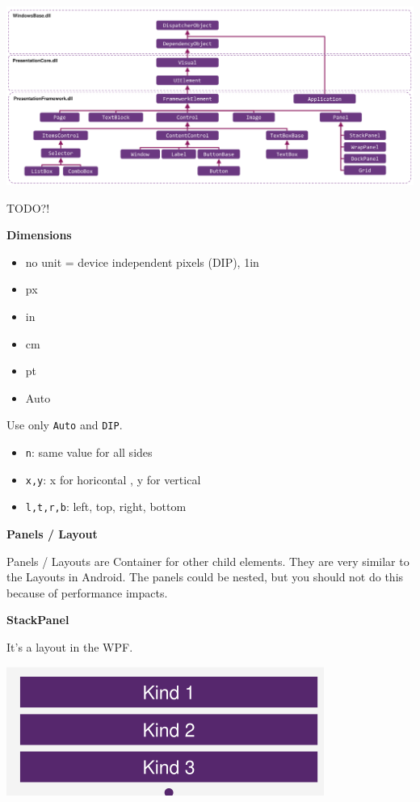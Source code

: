 \documentclass[10pt,twoside,landscape]{article}
\begin{document}
\begin{multicols}{4}
\begin{center}
\includegraphics[width=.9\linewidth]{img/class_hierarchy.png}
\end{center}

TODO?!

\textbf{Dimensions}

\begin{itemize}
\item no unit = device independent pixels (DIP), 1in
\item px
\item in
\item cm
\item pt
\item Auto
\end{itemize}

Use only \texttt{Auto} and \texttt{DIP}.
\begin{itemize}
\item \texttt{n}: same value for all sides
\item \texttt{x,y}: x for horicontal , y for vertical
\item \texttt{l,t,r,b}: left, top, right, bottom
\end{itemize}

\textbf{Panels / Layout}

Panels / Layouts are Container for other child elements.
They are very similar to the Layouts in Android.
The panels could be nested, but you should not do this because of performance impacts.

\textbf{StackPanel}

It's a layout in the WPF.

\begin{center}
\includegraphics[width=.9\linewidth]{img/stack_panel_vertical.png}
\end{center}


\end{multicols}
\end{document}

